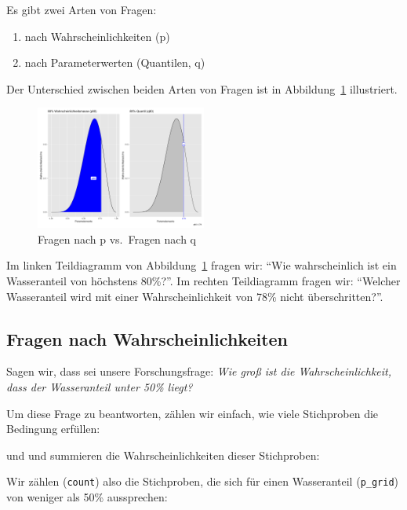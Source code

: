 \documentclass[
  a4paper,
  DIV=11]{scrreprt}
\providecommand{\tightlist}{%
  \setlength{\itemsep}{0pt}\setlength{\parskip}{0pt}}\usepackage{longtable,booktabs,array}
\theoremstyle{definition}
\theoremstyle{remark}
\begin{document}
Es gibt zwei Arten von Fragen:

\begin{enumerate}
\def\labelenumi{\arabic{enumi}.}
\tightlist
\item
  nach Wahrscheinlichkeiten (p)
\item
  nach Parameterwerten (Quantilen, q)
\end{enumerate}

Der Unterschied zwischen beiden Arten von Fragen ist in
Abbildung~\ref{fig-p-vs-q} illustriert.

\begin{figure}

{\centering \includegraphics[width=0.5\textwidth,height=\textheight]{./img/p-vs-q.png}

}

\caption{\label{fig-p-vs-q}Fragen nach p vs.~Fragen nach q}

\end{figure}

Im linken Teildiagramm von Abbildung~\ref{fig-p-vs-q} fragen wir: ``Wie
wahrscheinlich ist ein Wasseranteil von höchstens 80\%?''. Im rechten
Teildiagramm fragen wir: ``Welcher Wasseranteil wird mit einer
Wahrscheinlichkeit von 78\% nicht überschritten?''.

\hypertarget{fragen-nach-wahrscheinlichkeiten}{%
\subsection{Fragen nach
Wahrscheinlichkeiten}\label{fragen-nach-wahrscheinlichkeiten}}

Sagen wir, dass sei unsere Forschungsfrage: \emph{Wie groß ist die
Wahrscheinlichkeit, dass der Wasseranteil unter 50\% liegt?}

Um diese Frage zu beantworten, zählen wir einfach, wie viele Stichproben
die Bedingung erfüllen:

und und summieren die Wahrscheinlichkeiten dieser Stichproben:

Wir zählen (\texttt{count}) also die Stichproben, die sich für einen
Wasseranteil (\texttt{p\_grid}) von weniger als 50\% aussprechen:
\end{document}
